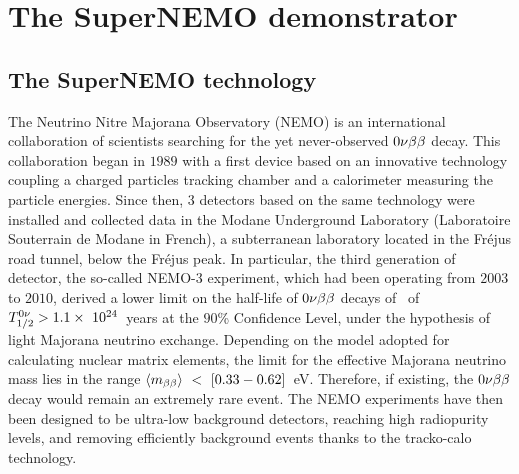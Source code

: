 \chapter{The SuperNEMO demonstrator}
\label{ch:detector}


\section{The SuperNEMO technology}

The Neutrino Nitre Majorana Observatory (NEMO) is an international collaboration of scientists searching for the yet never-observed $0\nu\beta\beta$ decay.
This collaboration began in $1989$ with a first device based on an innovative technology coupling a charged particles tracking chamber and a calorimeter measuring the particle energies.
Since then, $3$ detectors based on the same technology were installed and collected data in the Modane Underground Laboratory (Laboratoire Souterrain de Modane in French), a subterranean laboratory located in the Fréjus road tunnel, below the Fréjus peak.
In particular, the third generation of detector, the so-called NEMO-$3$ experiment, which had been operating from $2003$ to $2010$, derived a lower limit on the half-life of $0\nu\beta\beta$ decays of \Mo\ of $T_{1/2}^{0\nu}>1.1\times~10^{24}$~years at the $90$\% Confidence Level, under the hypothesis of light Majorana neutrino exchange.
Depending on the model adopted for calculating nuclear matrix elements, the limit for the effective Majorana neutrino mass lies in the range $\langle m_{\beta\beta}\rangle~<~[0.33-0.62]$~eV.
Therefore, if existing, the $0\nu\beta\beta$ decay would remain an extremely rare event.
The NEMO experiments have then been designed to be ultra-low background detectors, reaching high radiopurity levels, and removing efficiently background events thanks to the tracko-calo technology.

